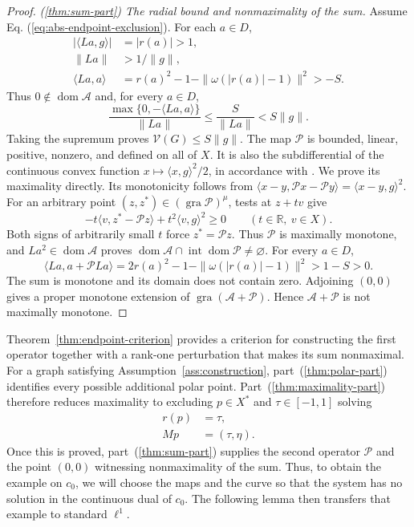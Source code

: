\documentclass[11pt]{article}
\newcommand{\R}{\mathbb R}
\newcommand{\gra}{\operatorname{gra}}
\newcommand{\dom}{\operatorname{dom}}
\newcommand{\pair}[2]{\langle #1,#2\rangle}
\theoremstyle{definition}
\theoremstyle{remark}
\begin{document}
\begin{proof}
\noindent\textit{\textup{(\ref{thm:sum-part})} The radial bound and nonmaximality of the sum.}
Assume Eq. (\ref{eq:abs-endpoint-exclusion}). For each $a\in D$,
\[
\begin{aligned}
|\pair{La}{g}|&=|r(a)|>1,\\
\|La\|&>1/\|g\|,\\
\pair{La}{a}&=r(a)^2-1-\|\omega(|r(a)|-1)\|^2>-S.
\end{aligned}
\]
Thus $0\notin\dom\mathcal A$ and, for every $a\in D$,
\[
\frac{\max\{0,-\pair{La}{a}\}}{\|La\|}
\le\frac{S}{\|La\|}<S\|g\|.
\]
Taking the supremum proves $\mathcal V(G)\le S\|g\|$. The map $\mathcal P$ is bounded, linear, positive, nonzero, and defined on all of $X$. It is also the subdifferential of the continuous convex function $x\mapsto\pair{x}{g}^2/2$, in accordance with \cite{rockafellar1970subdiff}. We prove its maximality directly. Its monotonicity follows from $\pair{x-y}{\mathcal Px-\mathcal Py}=\pair{x-y}{g}^2$. For an arbitrary point $(z,z^*)\in(\gra\mathcal P)^\mu$, tests at $z+tv$ give
\[
-t\pair{v}{z^*-\mathcal Pz}+t^2\pair{v}{g}^2\ge0
\qquad(t\in\R,\ v\in X).
\]
Both signs of arbitrarily small $t$ force $z^*=\mathcal Pz$. Thus $\mathcal P$ is maximally monotone, and $La^2\in\dom\mathcal A$ proves $\dom\mathcal A\cap\operatorname{int}\dom\mathcal P\ne\varnothing$. For every $a\in D$,
\[
\pair{La}{a+\mathcal PLa}
=2r(a)^2-1-\|\omega(|r(a)|-1)\|^2>1-S>0.
\]
The sum is monotone and its domain does not contain zero. Adjoining $(0,0)$ gives a proper monotone extension of $\gra(\mathcal A+\mathcal P)$. Hence $\mathcal A+\mathcal P$ is not maximally monotone.
\end{proof}

Theorem~\ref{thm:endpoint-criterion} provides a criterion for constructing the first operator together with a rank-one perturbation that makes its sum nonmaximal. For a graph satisfying Assumption~\ref{ass:construction}, part~\textup{(\ref{thm:polar-part})} identifies every possible additional polar point. Part~\textup{(\ref{thm:maximality-part})} therefore reduces maximality to excluding $p\in X^*$ and $\tau\in[-1,1]$ solving
\[
\begin{aligned}
r(p)&=\tau,\\
Mp&=(\tau,\eta).
\end{aligned}
\]
Once this is proved, part~\textup{(\ref{thm:sum-part})} supplies the second operator $\mathcal P$ and the point $(0,0)$ witnessing nonmaximality of the sum. Thus, to obtain the example on $c_0$, we will choose the maps and the curve so that the system has no solution in the continuous dual of $c_0$. The following lemma then transfers that example to standard $\ell^1$.
\end{document}
